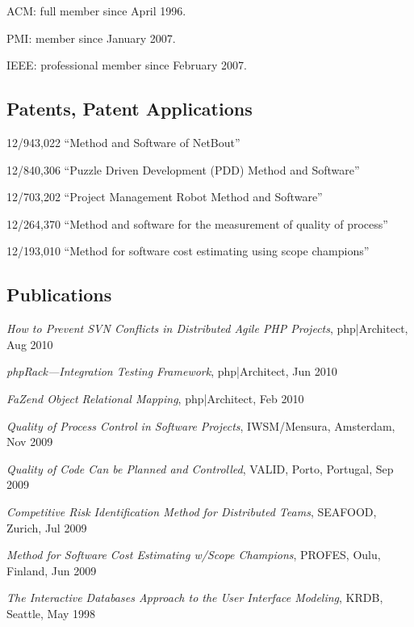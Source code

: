 \documentclass[12pt]{article}
\begin{document}
ACM: full member since April 1996.

PMI: member since January 2007.

IEEE: professional member since February 2007.

\subsection*{Patents, Patent Applications}

12/943,022 ``Method and Software of NetBout''

12/840,306 ``Puzzle Driven Development (PDD) Method and Software''

12/703,202 ``Project Management Robot Method and Software''

12/264,370 ``Method and software for the measurement of quality of process''

12/193,010 ``Method for software cost estimating using scope champions''

\subsection*{Publications}

\emph{How to Prevent SVN Conflicts in Distributed Agile PHP Projects},
php|Architect, Aug 2010

\emph{phpRack---Integration Testing Framework},
php|Architect, Jun 2010

\emph{FaZend Object Relational Mapping},
php|Architect, Feb 2010

\emph{Quality of Process Control in Software Projects},
IWSM/Mensura, Amsterdam, Nov 2009

\emph{Quality of Code Can be Planned and Controlled},
VALID, Porto, Portugal, Sep 2009

\emph{Competitive Risk Identification Method for Distributed Teams},
SEAFOOD, Zurich, Jul 2009

\emph{Method for Software Cost Estimating w/Scope Champions},
PROFES, Oulu, Finland, Jun 2009

\emph{The Interactive Databases Approach to the User Interface Modeling},
KRDB, Seattle, May 1998
\end{document}
